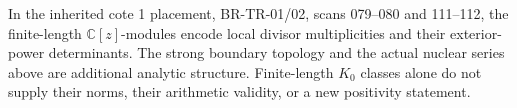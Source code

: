 In the inherited cote 1 placement, BR-TR-01/02,
scans 079--080 and 111--112, the finite-length
$\mathbb C[z]$-modules encode local divisor multiplicities
and their exterior-power determinants.  The strong
boundary topology and the actual nuclear series above
are additional analytic structure.  Finite-length
$K_0$ classes alone do not supply their norms, their
arithmetic validity, or a new positivity statement.
